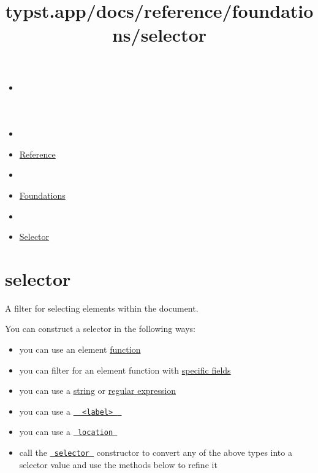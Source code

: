 \title{typst.app/docs/reference/foundations/selector}

\begin{itemize}
\tightlist
\item
  \href{/docs}{}
\item
  
\item
  \href{/docs/reference/}{Reference}
\item
  
\item
  \href{/docs/reference/foundations/}{Foundations}
\item
  
\item
  \href{/docs/reference/foundations/selector/}{Selector}
\end{itemize}

\section{\texorpdfstring{{ selector }}{ selector }}\label{summary}

A filter for selecting elements within the document.

You can construct a selector in the following ways:

\begin{itemize}
\tightlist
\item
  you can use an element
  \href{/docs/reference/foundations/function/}{function}
\item
  you can filter for an element function with
  \href{/docs/reference/foundations/function/\#definitions-where}{specific
  fields}
\item
  you can use a \href{/docs/reference/foundations/str/}{string} or
  \href{/docs/reference/foundations/regex/}{regular expression}
\item
  you can use a
  \href{/docs/reference/foundations/label/}{\texttt{\ }{\texttt{\ \textless{}label\textgreater{}\ }}\texttt{\ }}
\item
  you can use a
  \href{/docs/reference/introspection/location/}{\texttt{\ location\ }}
\item
  call the
  \href{/docs/reference/foundations/selector/}{\texttt{\ selector\ }}
  constructor to convert any of the above types into a selector value
  and use the methods below to refine it
\end{itemize}

